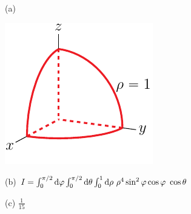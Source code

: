%

\begin{answer}
(a)
\begin{center}
     \includegraphics{fig/OE08D_8.pdf}
\end{center}

(b) $I=\int_0^{\pi/2}\dee{\varphi}\int_0^{\pi/2}\dee{\theta}\int_0^1\dee{\rho}\ 
         \rho^4\sin^2\varphi\cos\varphi\ \cos\theta$

(c) $\frac{1}{15}$
\end{answer}


